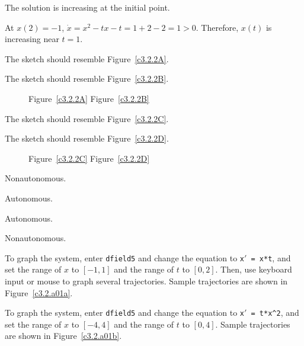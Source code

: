 \documentclass{ximera}
\begin{document}
  \ans The solution is increasing at the initial point.

\soln At $x(2)=-1$, $\dot{x}=x^2-tx-t=1+2-2=1>0$.  Therefore, $x(t)$ is
increasing near $t=1$.

 The sketch should resemble Figure~\ref{c3.2.2A}.

 The sketch should resemble Figure~\ref{c3.2.2B}.
\begin{figure}[th]
     \centerline{%
     }
	\centerline{Figure~\ref{c3.2.2A}\hspace{2.1in} Figure~\ref{c3.2.2B}}
\end{figure} 

 The sketch should resemble Figure~\ref{c3.2.2C}.

 The sketch should resemble Figure~\ref{c3.2.2D}.
\begin{figure}[th]
     \centerline{%
     }
	\centerline{Figure~\ref{c3.2.2C}\hspace{2.1in} Figure~\ref{c3.2.2D}}
\end{figure} 

 Nonautonomous.

 Autonomous.

 Autonomous.

 Nonautonomous.


\newpage
{}
To graph the system, enter {\tt dfield5} and change the equation to
{\tt x$'$ = x*t}, and set the range of $x$ to $[-1,1]$ and the range
of $t$ to $[0,2]$.  Then, use keyboard input or mouse to graph
several trajectories.  Sample trajectories are shown in
Figure~\ref{c3.2.a01a}.

\begin{figure}[htb]
                       \centerline{%
                       }
\end{figure}

To graph the system, enter {\tt dfield5} and change the equation to
{\tt x$'$ = t*x\^{}2}, and set the range of $x$ to $[-4,4]$ and the range
of $t$ to $[0,4]$.  Sample trajectories are shown in
Figure~\ref{c3.2.a01b}.

\begin{figure}[htb]
                       \centerline{%
                       }
\end{figure}
\end{document}
